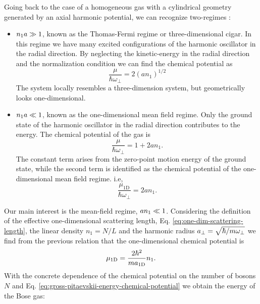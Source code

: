 Going back to the case of a homogeneous gas with a cylindrical geometry generated by an axial harmonic potential, we can
recognize two-regimes \cite[pp~325]{bib:pitaevskii-stringari-bec.2003}:

\begin{itemize}
    \item $n_1 a \gg 1$, known as the Thomas-Fermi regime or three-dimensional cigar. In this regime we have many excited configurations of the harmonic oscillator in the radial direction. By neglecting the kinetic-energy in the
    radial direction and the normalization condition we can find the chemical potential as
    \begin{equation}
        \frac{\mu}{\hbar \omega_\bot} = 2(a n_1)^{1/2}
    \end{equation}
    The system locally resembles a three-dimension system, but geometrically looks one-dimensional.

    \item $n_1 a \ll 1$, known as the one-dimensional mean field regime. Only the ground state of the
    harmonic oscillator in the radial direction contributes to the energy. The chemical potential of the gas is
    \begin{equation}
        \label{eq:gross-pitaevskii-cigar-like-chemical-potential}
        \frac{\mu}{\hbar \omega_\bot} = 1 + 2 a n_1.
    \end{equation}
    The constant term arises from the zero-point motion energy of the ground state, while the second term
    is identified
    as the chemical potential of the one-dimensional mean field regime. i.e,
    \begin{equation}
        \frac{\mu_\mathrm{1D}}{\hbar \omega_\bot} = 2 a n_1.
    \end{equation}
\end{itemize}
%
Our main interest is the mean-field regime, $a n_1 \ll 1$. Considering the definition of the effective one-dimensional
scattering length, Eq. \eqref{eq:one-dim-scattering-length}, the linear density $n_1 = N / L$ and the harmonic radius
$a_\bot = \sqrt{\hbar / m \omega_\bot}$ we find from the previous relation that the one-dimensional chemical potential is
%
\begin{equation}
    \mu_\mathrm{1D} = \frac{2 \hbar^2}{m a_{ \mathrm{1D} }} n_1.
\end{equation}
%
With the concrete dependence of the chemical potential on the number of bosons $N$ and Eq. \eqref{eq:gross-pitaevskii-energy-chemical-potential} we obtain the energy of the Bose gas:
